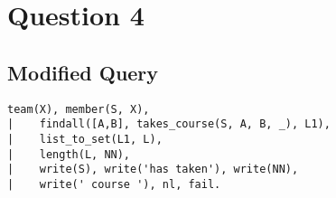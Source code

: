 \section{Question 4}

\subsection{Modified Query}
\begin{lstlisting}
team(X), member(S, X),
|    findall([A,B], takes_course(S, A, B, _), L1),
|    list_to_set(L1, L),
|    length(L, NN),
|    write(S), write('has taken'), write(NN),
|    write(' course '), nl, fail.
\end{lstlisting}

